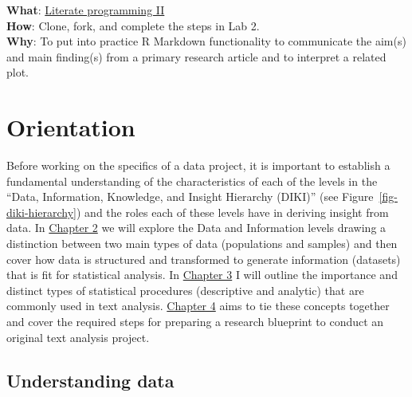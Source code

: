 \documentclass[
  letterpaper,
]{latex/krantz}
\begin{document}
\begin{tcolorbox}[enhanced jigsaw, opacitybacktitle=0.6, breakable, colframe=quarto-callout-tip-color-frame, arc=.35mm, left=2mm, leftrule=.75mm, title=\textcolor{quarto-callout-tip-color}{\faLightbulb}\hspace{0.5em}{Lab}, opacityback=0, colback=white, toptitle=1mm, rightrule=.15mm, titlerule=0mm, bottomtitle=1mm, bottomrule=.15mm, coltitle=black, colbacktitle=quarto-callout-tip-color!10!white, toprule=.15mm]
\textbf{What}: \href{https://github.com/lin380/lab_2}{Literate
programming II}\\
\textbf{How}: Clone, fork, and complete the steps in Lab 2.\\
\textbf{Why}: To put into practice R Markdown functionality to
communicate the aim(s) and main finding(s) from a primary research
article and to interpret a related plot.
\end{tcolorbox}

\part{Orientation}

Before working on the specifics of a data project, it is important to
establish a fundamental understanding of the characteristics of each of
the levels in the ``Data, Information, Knowledge, and Insight Hierarchy
(DIKI)'' (see Figure~\ref{fig-diki-hierarchy}) and the roles each of
these levels have in deriving insight from data. In
\protect\hyperlink{understanding-data-chapter}{Chapter 2} we will
explore the Data and Information levels drawing a distinction between
two main types of data (populations and samples) and then cover how data
is structured and transformed to generate information (datasets) that is
fit for statistical analysis. In
\protect\hyperlink{approaching-analysis-chapter}{Chapter 3} I will
outline the importance and distinct types of statistical procedures
(descriptive and analytic) that are commonly used in text analysis.
\protect\hyperlink{framing-research-chapter}{Chapter 4} aims to tie
these concepts together and cover the required steps for preparing a
research blueprint to conduct an original text analysis project.

\hypertarget{sec-understanding-data}{%
\chapter{Understanding data}\label{sec-understanding-data}}
\end{document}
